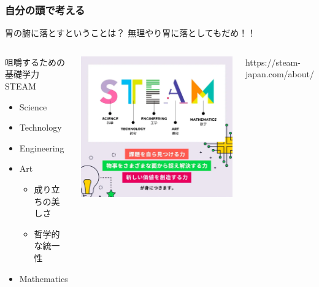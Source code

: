 \documentclass[12pt, dvipdfmx]{beamer}
\begin{document}
\begin{frame}
    \frametitle{自分の頭で考える}
        \begin{alertblock}{胃の腑に落とすということは？}
            無理やり胃に落としてもだめ！！
        \end{alertblock}
        \begin{columns}[T, onlytextwidth]
            \vspace{-3mm}
            \begin{block}{咀嚼するための基礎学力}
                STEAM 
                \begin{itemize}
                    \item Science
                    \item Technology
                    \item Engineering
                    \item \alert{Art}
                    \begin{itemize}
                        \item<2-> 成り立ちの美しさ
                        \item<2-> 哲学的な統一性 
                    \end{itemize}
                    \item Mathematics
                \end{itemize}
            \end{block}
                \centering
                    \includegraphics[width=\textwidth]{steam.png}

                    \footnotesize{https://steam-japan.com/about/}
        \end{columns}
\end{frame}
\end{document}
